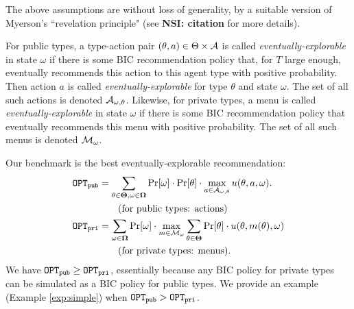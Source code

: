 
\noindent The above assumptions are without loss of generality, by a suitable version of Myerson's ``revelation principle" (see {\bf NSI: citation} for more details).

\iffalse
For reported types and private types, we assume that the message in each round is a \emph{menu} a mapping types to actions, and assume that the recommendation policy satisfies a similar but technically different BIC condition. Again, this is without loss of generality by revelation principle. to state the BIC condition, let $\pi^t$ be the menu recommended in round $t$. The recommendation policy $\pi$ is BIC if for each round $t$, type $\theta$, and any two menus $m,m'$ such that
    $\Pr[\pi^t= m|\EE_{t-1}] > 0$, we have
\begin{align}\label{eq:model-BIC-menus}
\E\left[\; u(\theta,m(\theta),\omega) - u(\theta,m'(\theta),\omega)
    \mid \pi^t = m, \EE_{t-1}\;\right] \geq 0.
\end{align}
(Again, the expectation is over the realized state $\omega$ and the randomness in the policy.)
\fi

For public types, a type-action pair $(\theta,a)\in \Theta\times \mathcal{A}$ is called \emph{eventually-explorable} in state $\omega$ if there is some BIC recommendation policy that, for $T$ large enough, eventually recommends this action to this agent type with positive probability. Then action $a$ is called \emph{eventually-explorable} for type $\theta$ and state $\omega$. The set of all such actions is denoted $\mathcal{A}_{\omega,\theta}$. Likewise, for private types, a menu is called \emph{eventually-explorable} in state $\omega$ if there is some BIC recommendation policy that eventually recommends this menu with positive probability. The set of all such menus is denoted $\mathcal{M}_{\omega}$.

Our benchmark is the best eventually-explorable recommendation:
\begin{align*}
\mathtt{OPT}_{\mathtt{pub}} &= \sum_{\theta \in \bold{\Theta}, \omega\in \bold{\Omega}} \Pr[\omega] \cdot \Pr[\theta] \cdot \max_{a \in \mathcal{A}_{\omega,\theta}} u(\theta, a, \omega).\\
    &\qquad\text{(for public types: actions)}\\
\mathtt{OPT}_{\mathtt{pri}} &= \sum_{\omega\in \bold{\Omega}} \Pr[\omega] \cdot\max_{m \in \mathcal{M}_{\omega}}\sum_{\theta \in \bold{\Theta}} \Pr[\theta] \cdot  u(\theta, m(\theta), \omega)\\
&\qquad\text{(for private types: menus)}.
\end{align*}
We have $\mathtt{OPT}_{\mathtt{pub}} \geq \mathtt{OPT}_{\mathtt{pri}}$, essentially because any BIC policy for private types can be simulated as a BIC policy for public types. We provide an example (Example \ref{exp:simple}) when $\mathtt{OPT}_{\mathtt{pub}} > \mathtt{OPT}_{\mathtt{pri}}$.

